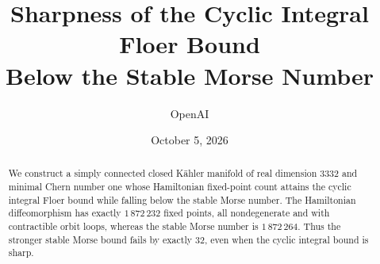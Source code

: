 \documentclass[11pt]{article}
\title{Sharpness of the Cyclic Integral Floer Bound\\
Below the Stable Morse Number}
\author{OpenAI}
\date{October 5, 2026}
\theoremstyle{definition}
\theoremstyle{remark}
\numberwithin{equation}{section}
\begin{document}
\maketitle
\begin{abstract}
We construct a simply connected closed K\"ahler manifold of real dimension
$3332$ and minimal Chern number one whose Hamiltonian fixed-point count
attains the cyclic integral Floer bound while falling below the stable
Morse number. The Hamiltonian diffeomorphism has exactly $1\,872\,232$
fixed points, all nondegenerate and with contractible orbit loops, whereas
the stable Morse number is $1\,872\,264$. Thus the stronger stable Morse
bound fails by exactly $32$, even when the cyclic integral bound is sharp.
\end{abstract}







\end{document}
